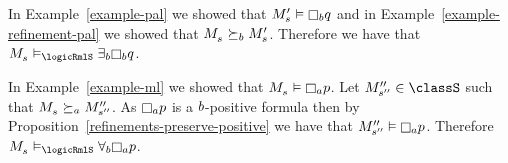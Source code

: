 \begin{example}
In Example~\ref{example-pal} we showed that $\kPModelP{\kStateS} \entails \knowsB \atomQ$ and in Example~\ref{example-refinement-pal} we showed that $\kPModel{\kStateS} \simulatesB \kPModelP{\kStateS}$.
Therefore we have that $\kPModel{\kStateS} \entails_\logicRmlS \somerefsB \knowsB \atomQ$.

In Example~\ref{example-ml} we showed that $\kPModel{\kStateS} \entails \knowsA \atomP$.
Let $\kPModelPP{\kStateSPP} \in \classS$ such that $\kPModel{\kStateS} \simulatesA \kPModelPP{\kStateSPP}$.
As $\knowsA \atomP$ is a $b$-positive formula then by Proposition~\ref{refinements-preserve-positive} we have that $\kPModelPP{\kStateSPP} \entails \knowsA \atomP$.
Therefore $\kPModel{\kStateS} \entails_\logicRmlS \allrefsB \knowsA \atomP$.
\end{example}

